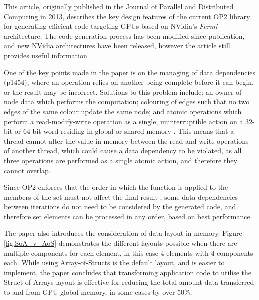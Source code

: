 This article, originally published in the Journal of Parallel and Distributed Computing in 2013, describes the key design features of the current OP2 library for generating efficient code targeting GPUs based on NVidia’s \textit{Fermi} architecture. The code generation process has been modified since publication, and new NVidia architectures have been released, however the article still provides useful information.
\par
One of the key points made in the paper is on the managing of data dependencies (p1454), where an operation relies on another being complete before it can begin, or the result may be incorrect. Solutions to this problem include: an owner of node data which performs the computation; colouring of edges such that no two edges of the same colour update the same node; and atomic operations which perform a read-modify-write operation as a single, uninterruptible action on a 32-bit or 64-bit word residing in global or shared memory \cite[p96]{guide}. This means that a thread cannot alter the value in memory between the read and write operations of another thread, which could cause a data dependency to be violated, as all three operations are performed as a single atomic action, and therefore they cannot overlap.
\par
Since OP2 enforces that the order in which the function is applied to the members of the set must not affect the final result \cite[p4]{manual}, some data dependencies between iterations do not need to be considered by the generated code, and therefore set elements can be processed in any order, based on best performance.
\par
The paper also introduces the consideration of data layout in memory. Figure \ref{fig:SoA_v_AoS} demonstrates the different layouts possible when there are multiple components for each element, in this case 4 elements with 4 components each. While using Array-of-Structs is the default layout, and is easier to implement, the paper concludes that transforming application code to utilise the Struct-of-Arrays layout is effective for reducing the total amount data transferred to and from GPU global memory, in some cases by over 50\%.


